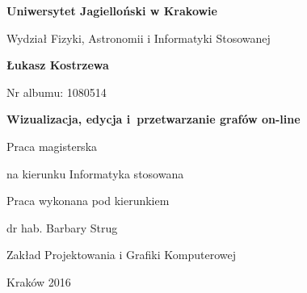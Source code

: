 \begin{titlepage}
\centering
\textbf{\Large Uniwersytet Jagielloński w Krakowie}\par
\vspace{0.2cm}
{\Large Wydział Fizyki, Astronomii i Informatyki Stosowanej}\par
\vfill
\textbf{\Large Łukasz Kostrzewa}\par
\vspace{0.2cm}
{\small Nr albumu: 1080514\par}
\vspace{1.5cm}
\textbf{\huge Wizualizacja, edycja i~przetwarzanie grafów on-line}\par
\vspace{1cm}
Praca magisterska\par
na kierunku Informatyka stosowana\par
\vfill
\begin{flushright}
Praca wykonana pod kierunkiem \par
dr hab. Barbary Strug\par
Zakład Projektowania i Grafiki Komputerowej\par
\end{flushright}
\vspace{1cm}
Kraków 2016\par
\end{titlepage}